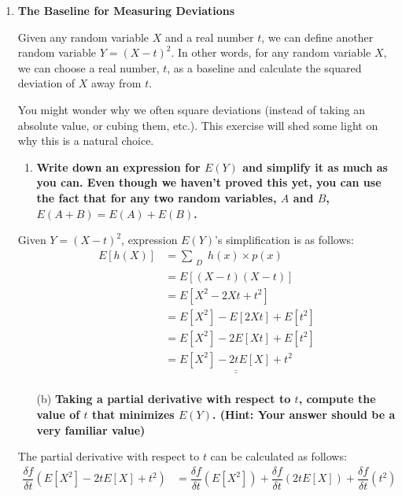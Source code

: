 \documentclass[12pt,a4paper]{article}
\numberwithin{equation}{subsection}
\def\doubleunderline#1{\underline{\underline{#1}}}
\begin{document}
\begin{enumerate}

\item \textbf{The Baseline for Measuring Deviations}

Given any random variable $X$ and a real number $t$, we can define another random variable $Y = (X - t)^2$. In other words, for any random variable $X$, we can choose a real number, $t$, as a baseline and calculate the squared deviation of $X$ away from $t$.

You might wonder why we often square deviations (instead of taking an absolute value, or cubing them, etc.).  This exercise will shed some light on why this is a natural choice.

\begin{enumerate}
\item \textbf{Write down an expression for $E(Y)$ and simplify it as much as you can.  Even though we haven't proved this yet, you can use the fact that for any two random variables, $A$ and $B$, $E(A + B) = E(A) + E(B)$.}
\end{enumerate}
Given $Y = (X - t)^2$, expression $E(Y)$'s simplification is as follows:
\begin{equation*}
\begin{split}
E[h(X)] & = \sum_{\substack{D}}h(x) \times p(x) \\
& = E[(X - t)(X - t)]\\
& = E[X^2 - 2Xt + t^2] \\
& = E[X^2] - E[2Xt] + E[t^2] \\
& = E[X^2] - 2E[Xt] + E[t^2] \\
& = \doubleunderline{E[X^2] - 2tE[X] + t^2} \\
\end{split}
\end{equation*}
\begin{enumerate}
\item[(b)] \textbf{Taking a partial derivative with respect to $t$, compute the value of $t$ that minimizes $E(Y)$.  (Hint: Your answer should be a very familiar value)}
\end{enumerate}
The partial derivative with respect to $t$ can be calculated as follows:
\begin{equation*}
\begin{split}
\dfrac{\delta f}{\delta t}(E[X^2] - 2tE[X] + t^2) & = \dfrac{\delta f}{\delta t}(E[X^2]) + \dfrac{\delta f}{\delta t}(2tE[X]) + \dfrac{\delta f}{\delta t}(t^2) \\

\end{split}
\end{equation*}
\end{enumerate}
\end{document}
